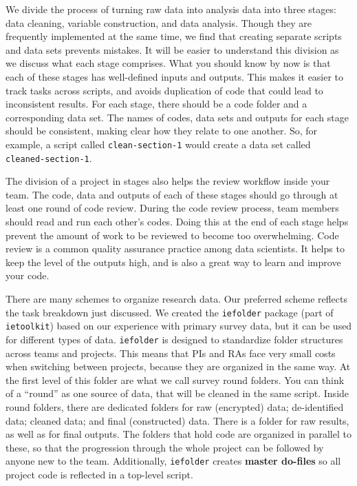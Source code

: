 We divide the process of turning raw data into analysis data into three stages: 
data cleaning, variable construction, and data analysis. 
Though they are frequently implemented at the same time, 
we find that creating separate scripts and data sets prevents mistakes. 
It will be easier to understand this division as we discuss what each stage comprises. 
What you should know by now is that each of these stages has well-defined inputs and outputs. 
This makes it easier to track tasks across scripts, 
and avoids duplication of code that could lead to inconsistent results. 
For each stage, there should be a code folder and a corresponding data set. 
The names of codes, data sets and outputs for each stage should be consistent,
making clear how they relate to one another. 
So, for example, a script called \texttt{clean-section-1} would create
a data set called \texttt{cleaned-section-1}.

The division of a project in stages also helps the review workflow inside your team.
The code, data and outputs of each of these stages should go through at least one round of code review.
During the code review process, team members should read and run each other's codes.
Doing this at the end of each stage helps prevent the amount of work to be reviewed to become too overwhelming.
Code review is a common quality assurance practice among data scientists.
It helps to keep the level of the outputs high, and is also a great way to learn and improve your code.

There are many schemes to organize research data. 
Our preferred scheme reflects the task breakdown just discussed.
We created the \texttt{iefolder}
package (part of \texttt{ietoolkit})
based on our experience with primary survey data,
but it can be used for different types of data. 
\texttt{iefolder} is designed to standardize folder structures across teams and projects.
This means that PIs and RAs face very small costs when switching between projects, 
because they are organized in the same way.
At the first level of this folder are what we call survey round folders.
You can think of a ``round'' as one source of data, 
that will be cleaned in the same script. 
Inside round folders, there are dedicated folders for 
raw (encrypted) data; de-identified data; cleaned data; and final (constructed) data. 
There is a folder for raw results, as well as for final outputs. 
The folders that hold code are organized in parallel to these, 
so that the progression through the whole project can be followed by anyone new to the team.  
Additionally, \texttt{iefolder} creates \textbf{master do-files} 
so all project code is reflected in a top-level script.

